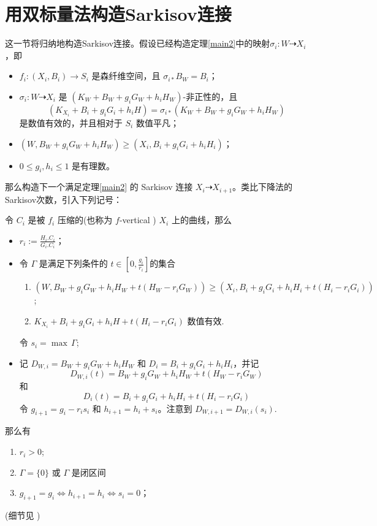 \section{用双标量法构造Sarkisov连接}
这一节将归纳地构造Sarkisov连接。假设已经构造定理\ref{main2}中的映射$\sigma_{i}:W\dashrightarrow X_{i}$，即
\begin{itemize}
  \item $f_{i}:(X_{i},B_{i})\to S_{i}$ 是森纤维空间，且 $\sigma_{i*} B_{W}=B_{i}$；
  \item $\sigma_{i}:W\dashrightarrow  X_{i}$ 是 $(K_{W}+B_{W}+g_{i}G_{W}+h_{i}H_{W})$-非正性的，且
    \[(K_{X_{i}}+B_{i}+g_{i}G_{i}+h_{i}H)=\sigma_{i*}(K_{W}+B_{W}+g_{i}G_{W}+h_{i}H_{W}) \]
    是数值有效的，并且相对于 $S_{i}$ 数值平凡；
  \item $(W,B_{W}+g_{i}G_{W}+h_{i}H_{W})\geqslant (X_{i},B_{i}+g_{i}G_{i}+h_{i}H_{i})$；
  \item $0\leqslant g_{i},h_{i}\leqslant 1$ 是有理数。
\end{itemize}
那么构造下一个满足定理\ref{main2} 的 Sarkisov 连接 $X_{i}\dashrightarrow X_{i+1}$。类比下降法的Sarkisov次数，引入下列记号：
\begin{definition}\label{doubledegree}
  令 $C_{i}$ 是被 $f_{i}$ 压缩的(也称为 $f$-vertical  )  $X_{i}$ 上的曲线，那么
  \begin{itemize}
    \item $r_{i}:=\frac{H_{i}.C_{i}}{G_{i}.C_{i}}$；
    \item 令 $\Gamma$ 是满足下列条件的 $t\in [0,\frac{g_{i}}{r_{i}}] $的集合
      \begin{enumerate}
        \item\label{singularcondition} $\left(W,B_{W}+g_{i}G_{W}+h_{i}H_{W}+t(H_{W}-r_{i}G_{W})\right)\geqslant \left(X_{i},B_{i}+g_{i}G_{i}+h_{i}H_{i}+t\left(H_{i}-r_{i}G_{i}\right)\right)$;
        \item $K_{X_{i}}+B_{i}+g_{i}G_i+h_{i}H+t(H_{i}-r_{i}G_{i})$  数值有效.
      \end{enumerate}
          令 $s_{i}=\max\, \Gamma $;
    \item 记 $D_{W,i}=B_{W}+g_{i}G_{W}+h_{i}H_{W}$ 和 $D_{i}=B_{i}+g_{i}G_{i}+h_{i}H_{i}$，并记
      \[D_{W,i}(t)=B_{W}+g_{i}G_{W}+h_{i}H_{W}+t(H_{W}-r_{i}G_{W})\]
      和
      \[D_{i}(t)=B_{i}+g_{i}G_{i}+h_{i}H_{i}+t (H_{i}-r_{i}G_{i})\]
      令 $g_{i+1}=g_{i}-r_{i}s_{i}$ 和 $h_{i+1}=h_{i}+s_{i}$。注意到 $D_{W,i+1}=D_{W,i}(s_{i})$.
  \end{itemize}
\end{definition}
那么有
\begin{enumerate}
  \item $r_{i}>0$;
  \item  $\Gamma=\{0\} $ 或 $\Gamma$ 是闭区间
  \item $g_{i+1}=g_{i} \Leftrightarrow h_{i+1}=h_{i} \Leftrightarrow s_{i}=0$；
\end{enumerate}
(细节见 \cite[Lemma 4.4]{liuSarkisovProgramGeneralized2021} )

